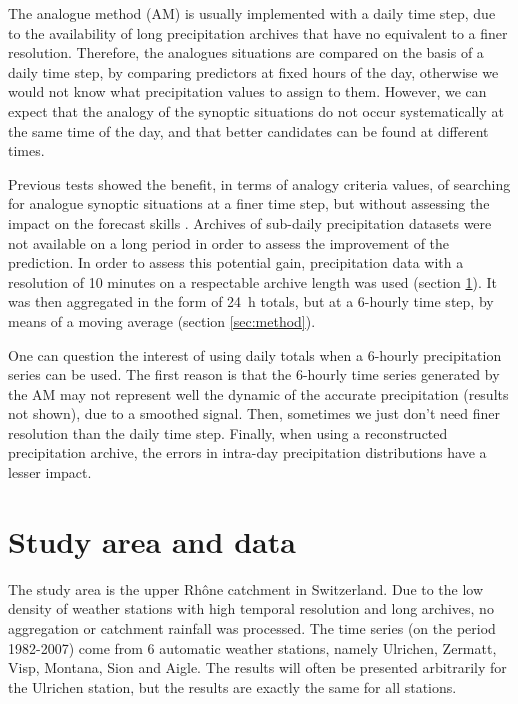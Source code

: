 \documentclass[hess]{copernicus}
\begin{document}
The analogue method (AM) is usually implemented with a daily time step, due to the availability of long precipitation archives that have no equivalent to a finer resolution. Therefore, the analogues situations are compared on the basis of a daily time step, by comparing predictors at fixed hours of the day, otherwise we would not know what precipitation values to assign to them. However, we can expect that the analogy of the synoptic situations do not occur systematically at the same time of the day, and that better candidates can be found at different times.

Previous tests showed the benefit, in terms of analogy criteria values, of searching for analogue synoptic situations at a finer time step, but without assessing the impact on the forecast skills \citep{Finet2008}. Archives of sub-daily precipitation datasets were not available on a long period in order to assess the improvement of the prediction. In order to assess this potential gain, precipitation data with a resolution of 10 minutes on a respectable archive length was used (section \ref{sec:data}). It was then aggregated in the form of 24~h totals, but at a 6-hourly time step, by means of a moving average (section \ref{sec:method}).

One can question the interest of using daily totals when a 6-hourly precipitation series can be used. The first reason is that the 6-hourly time series generated by the AM may not represent well the dynamic of the accurate precipitation (results not shown), due to a smoothed signal. Then, sometimes we just don't need finer resolution than the daily time step. Finally, when using a reconstructed precipitation archive, the errors in intra-day precipitation distributions have a lesser impact.








\section{Study area and data}
\label{sec:data}

The study area is the upper Rh\^{o}ne catchment in Switzerland. Due to the low density of weather stations with high temporal resolution and long archives, no aggregation or catchment rainfall was processed. The time series (on the period 1982-2007) come from 6 automatic weather stations, namely Ulrichen, Zermatt, Visp, Montana, Sion and Aigle. The results will often be presented arbitrarily for the Ulrichen station, but the results are exactly the same for all stations.
\end{document}
